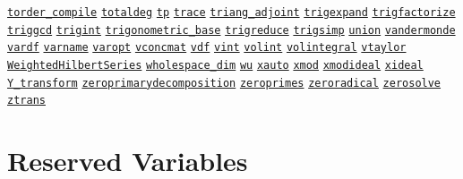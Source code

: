 \begin{list}{}
\hyperlink{operator:TORDER_COMPILE}{\texttt{torder\_compile}}
\hyperlink{operator:TOTALDEG}{\texttt{totaldeg}}
\hyperlink{operator:TP}{\texttt{tp}}
\hyperlink{operator:TRACE}{\texttt{trace}}
\hyperlink{operator:TRIANG_ADJOINT}{\texttt{triang\_adjoint}}
\hyperlink{operator:TRIGEXPAND}{\texttt{trigexpand}}
\hyperlink{operator:TRIGFACTORIZE}{\texttt{trigfactorize}}
\hyperlink{operator:TRIGGCD}{\texttt{triggcd}}
\hyperlink{operator:TRIGINT}{\texttt{trigint}}
\hyperlink{procedure:TRIGONOMETRIC_BASE}{\texttt{trigonometric\_base}}
\hyperlink{operator:TRIGREDUCE}{\texttt{trigreduce}}
\hyperlink{operator:TRIGSIMP}{\texttt{trigsimp}}
\hyperlink{operator:UNION}{\texttt{union}}
\hyperlink{operator:VANDERMONDE}{\texttt{vandermonde}}
\hyperlink{operator:VARDF}{\texttt{vardf}}
\hyperlink{operator:VARNAME}{\texttt{varname}}
\hyperlink{operator:VAROPT}{\texttt{varopt}}
\hyperlink{operator:VCONCMAT}{\texttt{vconcmat}}
\hyperlink{operator:VDF}{\texttt{vdf}}
\hyperlink{operator:VINT}{\texttt{vint}}
\hyperlink{operator:VOLINT}{\texttt{volint}}
\hyperlink{operator:VOLINTEGRAL}{\texttt{volintegral}}
\hyperlink{operator:VTAYLOR}{\texttt{vtaylor}}
\hyperlink{operator:WEIGHTEDHILBERTSERIES}{\texttt{WeightedHilbertSeries}}
\hyperlink{operator:WHOLESPACE_DIM}{\texttt{wholespace\_dim}}
\hyperlink{operator:WU}{\texttt{wu}}
\hyperlink{operator:XAUTO}{\texttt{xauto}}
\hyperlink{operator:XMOD}{\texttt{xmod}}
\hyperlink{operator:XMODIDEAL}{\texttt{xmodideal}}
\hyperlink{operator:XIDEAL}{\texttt{xideal}}
\hyperlink{operator:Y_TRANSFORM}{\texttt{Y\_transform}}
\hyperlink{operator:ZEROPRIMARYDECOMPOSITION}{\texttt{zeroprimarydecomposition}}
\hyperlink{operator:ZEROPRIMES}{\texttt{zeroprimes}}
\hyperlink{operator:ZERORADICAL}{\texttt{zeroradical}}
\hyperlink{operator:ZEROSOLVE}{\texttt{zerosolve}}
\hyperlink{operator:ZTRANS}{\texttt{ztrans}}
\halfinterwordspace

\section{Reserved Variables}


\end{list}
